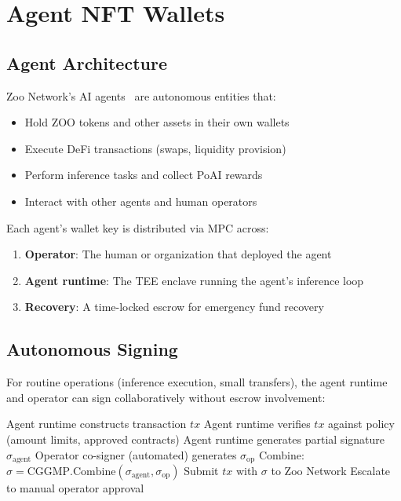 \section{Agent NFT Wallets}

\label{sec:agent-wallets}

\subsection{Agent Architecture}

Zoo Network's AI agents~\cite{zoo-agent-nft} are autonomous entities that:

\begin{itemize}
    \item Hold ZOO tokens and other assets in their own wallets
    \item Execute DeFi transactions (swaps, liquidity provision)
    \item Perform inference tasks and collect PoAI rewards
    \item Interact with other agents and human operators
\end{itemize}

Each agent's wallet key is distributed via MPC across:

\begin{enumerate}
    \item \textbf{Operator}: The human or organization that deployed the agent
    \item \textbf{Agent runtime}: The TEE enclave running the agent's inference loop
    \item \textbf{Recovery}: A time-locked escrow for emergency fund recovery
\end{enumerate}

\subsection{Autonomous Signing}

For routine operations (inference execution, small transfers), the agent runtime and operator can sign collaboratively without escrow involvement:

\begin{algorithm}[t]
\caption{Agent Autonomous Transaction}
\label{alg:agent}
\begin{algorithmic}[1]
\STATE Agent runtime constructs transaction $tx$
\STATE Agent runtime verifies $tx$ against policy (amount limits, approved contracts)
    \STATE Agent runtime generates partial signature $\sigma_{\text{agent}}$
    \STATE Operator co-signer (automated) generates $\sigma_{\text{op}}$
    \STATE Combine: $\sigma = \text{CGGMP.Combine}(\sigma_{\text{agent}}, \sigma_{\text{op}})$
    \STATE Submit $tx$ with $\sigma$ to Zoo Network
\ELSE
    \STATE Escalate to manual operator approval
\ENDIF
\end{algorithmic}
\end{algorithm}

